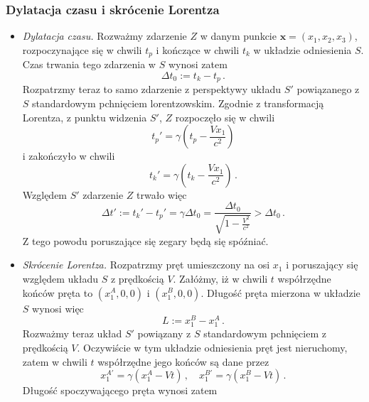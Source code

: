 \documentclass[../main.tex]{subfiles}
\begin{document}
\subsubsection{Dylatacja czasu i skrócenie Lorentza}
\begin{itemize}
    \item \textit{Dylatacja czasu.} Rozważmy zdarzenie \(Z\) w danym punkcie
    \(\mathbf{x}=(x_1,x_2,x_3)\), rozpoczynające się w chwili \(t_p\) i kończące w chwili \(t_k\) w
    układzie odniesienia \(S\). Czas trwania tego zdarzenia w \(S\) wynosi zatem
    \begin{equation*}
        \Delta t_0:=t_k-t_p\,.
    \end{equation*}
    Rozpatrzmy teraz to samo zdarzenie z perspektywy układu \(S'\) powiązanego z \(S\) standardowym
    pchnięciem lorentzowskim. Zgodnie z transformacją Lorentza, z punktu widzenia \(S'\), \(Z\)
    rozpoczęło się w chwili
    \begin{equation*}
        t_p'=\gamma\left(t_p-\frac{Vx_1}{c^2}\right)
    \end{equation*}
    i zakończyło w chwili
    \begin{equation*}
        t_k'=\gamma\left(t_k-\frac{Vx_1}{c^2}\right)\,.
    \end{equation*}
    Względem \(S'\) zdarzenie \(Z\) trwało więc
    \begin{equation*}
        \Delta t':=t_k'-t_p'=\gamma \Delta t_0=\frac{\Delta t_0}{\sqrt{1-\frac{V^2}{c^2}}}>\Delta t_0\,.
    \end{equation*}
    Z tego powodu poruszające się zegary będą się spóźniać.
    \item \textit{Skrócenie Lorentza.} Rozpatrzmy pręt umieszczony na osi \(x_1\) i poruszający się
    względem układu \(S\) z prędkością \(V\). Załóżmy, iż w chwili \(t\) współrzędne końców pręta to
    \((x_1^A,0,0)\) i \((x_1^B,0,0)\). Długość pręta mierzona w układzie \(S\) wynosi więc
    \begin{equation*}
        L:=x_1^B-x_1^A\,.
    \end{equation*}
    Rozważmy teraz układ \(S'\) powiązany z \(S\) standardowym pchnięciem z prędkością \(V\).
    Oczywiście w tym układzie odniesienia pręt jest nieruchomy, zatem w chwili \(t\) współrzędne
    jego końców są dane przez
    \begin{equation*}
        x_1^{A'}=\gamma(x_1^A-Vt)\,,\quad x_1^{B'}=\gamma(x_1^B-Vt)\,.
    \end{equation*}
    Długość spoczywającego pręta wynosi zatem
    \begin{equation*}

\end{equation*}
\end{itemize}
\end{document}
